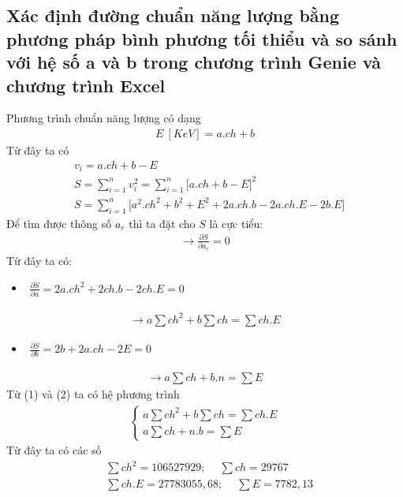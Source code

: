 \documentclass{article}
\begin{document}
\subsection{Xác định đường chuẩn năng lượng bằng phương pháp bình phương tối thiểu và so sánh với hệ số a và b trong chương trình Genie và chương trình Excel}
Phương trình chuẩn năng lượng có dạng
\begin{align*}
	E \ [KeV] = a.ch + b
\end{align*}
Từ đây ta có
\begin{align*}
	& v_i = a.ch + b - E \\
	& S = \sum_{i=1}^{n} v_i^2= \sum_{i=1}^{n}\Big[a.ch + b - E\Big]^2 \\
	& S = \sum_{i=1}^{n}\Big[a^2.ch^2 + b^2 + E^2 + 2a.ch.b - 2a.ch.E - 2b.E \Big]
\end{align*}
Để tìm được thông số $a_r$ thì ta đặt cho $S$ là cực tiểu:
\begin{align*}
	\rightarrow \frac{\partial S}{\partial a_r} = 0
\end{align*}
Từ đây ta có:
\begin{itemize} 
	\item $\begin{aligned}
				 \frac{\partial S}{\partial a} = 2a.ch^2 + 2ch.b - 2ch.E = 0
\end{aligned}$
\end{itemize}
\begin{align}
	\rightarrow a \sum{ch^2} + b\sum{ch} = \sum{ch.E}
\end{align}
\begin{itemize} 
	\item $\begin{aligned}
				 \frac{\partial S}{\partial b} = 2b + 2a.ch - 2E = 0
\end{aligned}$
\end{itemize}
\begin{align}
	\rightarrow a \sum{ch} + b.n =  \sum{E}
\end{align}
Từ (1) và (2) ta có hệ phương trình
\begin{align}
	\begin{cases}
	a \sum{ch^2} + b\sum{ch} =  \sum{ch.E} \\ 
	a \sum{ch} + n.b =  \sum{E} 
	\end{cases}
\end{align}
Từ đây ta có các số
\begin{align*}
	& \sum{ch^2} = 106527929; \ \quad \sum{ch} = 29767 \\
	& \sum{ch.E} = 27783055,68; \ \quad \sum{E} = 7782,13
\end{align*}
\end{document}
